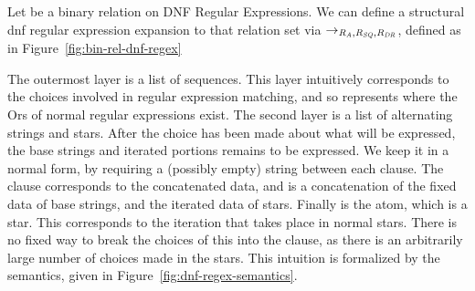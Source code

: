 Let \Relation{} be a binary relation on DNF Regular Expressions.
We can define a structural dnf regular expression expansion to that relation set via
$\rightarrow_{\mathit{R}_{\mathit{A}},\mathit{R}_{\mathit{SQ}},\mathit{R}_{\mathit{DR}}}$,
defined as in Figure~\ref{fig:bin-rel-dnf-regex}

The outermost layer is a list of sequences.
This layer intuitively corresponds to the choices involved in regular expression matching, and so represents where the Ors of normal regular expressions exist.
The second layer is a list of alternating strings and stars.
After the choice has been made about what will be expressed,
the base strings and iterated portions remains to be expressed.
We keep it in a normal form, by requiring a (possibly empty) string between
each clause.
The clause corresponds to the concatenated data, and is a concatenation of the
fixed data of base strings, and the iterated data of stars.
Finally is the atom, which is a star.
This corresponds to the iteration that takes place in normal stars.
There is no fixed way to break the choices of this into the clause,
as there is an arbitrarily large number of choices made in the stars.
This intuition is formalized by the semantics, given in
Figure~\ref{fig:dnf-regex-semantics}.

